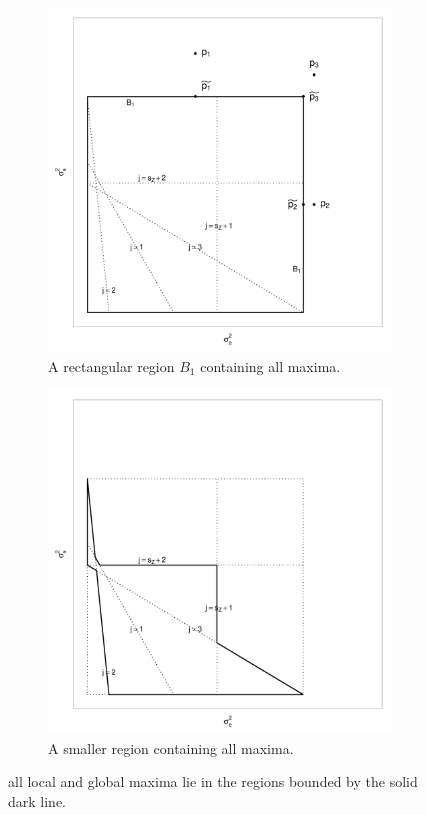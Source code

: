 \documentclass{report}
\begin{document}
\begin{figure}[h]
  \begin{subfigure}{.5\textwidth}
	\centering
	\includegraphics[width=.8\linewidth]{figs/boundingbox.pdf}
	\caption{A rectangular region $B_1$ containing all maxima.}
	\label{fig:bigboundingbox}
  \end{subfigure}
  \begin{subfigure}{.5\textwidth}
	\centering
	\includegraphics[width=.8\linewidth]{figs/smallboundingregion.pdf}
	\caption{A smaller region containing all maxima.}
	\label{fig:smallboundingbox}
  \end{subfigure}
  \caption{all local and global maxima lie in the regions bounded by the solid
                dark line.
               }
  \label{fig:boundingbox}
\end{figure}
\end{document}
